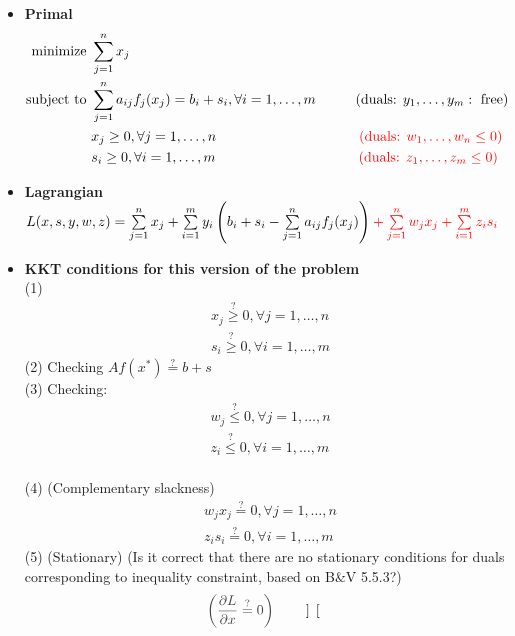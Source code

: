 \documentclass{article}
\begin{document}
\begin{itemize}
\item\textbf{Primal}
\begin{align*}
\text{minimize } & \sum\limits_{j=1}^n x_j\\
\text{subject to } & \sum\limits_{j=1}^n  a_{ij} f_j(x_j) = b_i + s_i, \forall i=1, \ldots, m  \hspace*{1cm}(\text{duals: } y_1, \ldots, y_m: \text{ free})\\
& x_j \ge 0, \forall j=1,\ldots,n \hspace*{3.6cm} \color{red}(\text{duals: } w_1,\ldots,w_n \le 0) \\
& s_i \ge 0, \forall i=1,\ldots,m \hspace*{3.6cm} \color{red}(\text{duals: } z_1,\ldots,z_m \le 0)
\end{align*}
\item \textbf{Lagrangian}\\
$L(x,s,y,w,z) = \sum\limits_{j=1}^n x_j + \sum\limits_{i=1}^m y_i\left(b_i+s_i-\sum\limits_{j=1}^na_{ij}f_j(x_j)\right) \color{red} + \sum\limits_{j=1}^n w_j x_j + \sum\limits_{i=1}^m z_i s_i$
\item \textbf{KKT conditions for this version of the problem}\\
(1)
\begin{align*} &x_j\stackrel{?}{\ge} 0,\forall j=1,\ldots,n \\
& s_i\stackrel{?}{\ge} 0,\forall i=1,\ldots,m
\end{align*}
(2) Checking $Af(x^*) \stackrel{?}{=} b + s$\\
(3) Checking:
\begin{align*}
&w_j \stackrel{?}{\le} 0, \forall j=1,\ldots,n\\
&z_i \stackrel{?}{\le} 0, \forall i=1,\ldots,m
\end{align*}\\
(4) (Complementary slackness) 
\begin{align*}
&w_j x_j \stackrel{?}{=} 0,\forall j=1,\ldots,n\\ 
&z_is_i \stackrel{?}{=} 0,\forall i=1,\ldots,m
\end{align*} 
(5) (Stationary) (Is it correct that there are no stationary conditions for duals corresponding to inequality constraint, based on B\&V 5.5.3?)
\begin{align*}
    &\color{darkgray}\left(\dfrac{\partial L}{\partial x} \stackrel{?}{=} 0\right) \hspace*{1cm}
    \color{black}\begin{bmatrix}

\end{bmatrix}
\end{align*}
\end{itemize}
\end{document}
